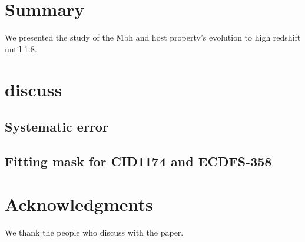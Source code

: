 \documentclass[apj]{emulateapj}
\begin{document}
\section{Summary}
\label{sec:sum}
We presented the study of the Mbh and host property's evolution to high redshift until 1.8.

\section{discuss}
\label{sec:dis}
\subsection{Systematic error}
\subsection{Fitting mask for CID1174 and ECDFS-358}

\section*{Acknowledgments}
We thank the people who discuss with the paper.



\end{document}

